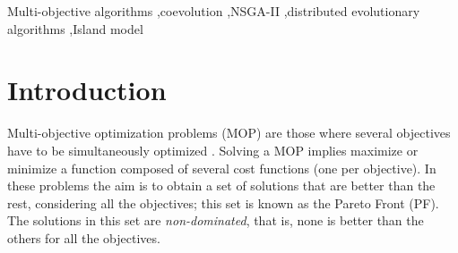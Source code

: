 \documentclass[preprint]{elsarticle}
\begin{document}
\begin{frontmatter}
\begin{keyword}
Multi-objective algorithms \sep coevolution \sep NSGA-II  \sep distributed evolutionary algorithms \sep Island model
\end{keyword}

\end{frontmatter}





\section{Introduction}


Multi-objective optimization problems (MOP) are those where several
objectives have to be simultaneously optimized
\citep{Mora13paretobased}. Solving a MOP implies maximize or minimize
a function composed of several cost functions (one per objective). In
these problems the aim is to obtain a set of solutions that are better
than the rest, considering all the objectives; this set is known as
the Pareto Front (PF). The solutions in this set are {\em non-dominated},
that is, none is better than the others for all the objectives.
\end{document}
